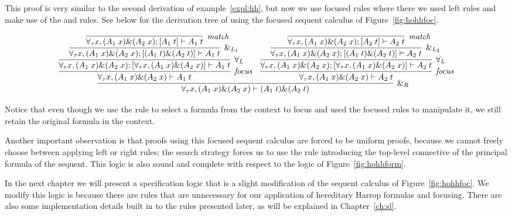 \begin{expl}
This proof is very similar to the second derivation of example~\ref{expl:hh}, but now we use focused rules where there we used left rules and make use of the  and  rules. See below for the derivation tree of  using the focused sequent calculus of Figure~\ref{fig:hohhfoc}.

{\scriptsize
$$
\infer[\rl{$\&_R$}]{\seq[\forall_\tau x , (A_1 \; x) \& (A_2 \; x)]{(A_1 \; t) \& (A_2 \; t)}}{
	\infer[\rl{focus}]{\seq[\forall_\tau x , (A_1 \; x) \& (A_2 \; x)]{A_1 \; t}}{
		\infer[\rl{$\forall_L$}]{\seq[\forall_\tau x , (A_1 \; x) \& (A_2 \; x) ; {[\forall_\tau x , (A_1 \; x) \& (A_2 \; x)]}]{A_1 \; t}}{
			\infer[\rl{$\&_{L_1}$}]{\seq[\forall_\tau x , (A_1 \; x) \& (A_2 \; x) ; {[(A_1 \; t) \& (A_2 \; t)]}]{A_1 \; t}}{
				\infer[\rl{match}]{\seq[\forall_\tau x , (A_1 \; x) \& (A_2 \; x) ; {[A_1 \; t]}]{A_1 \; t}}{}
			}
		}
	}
	&
	\infer[\rl{focus}]{\seq[\forall_\tau x , (A_1 \; x) \& (A_2 \; x)]{A_2 \; t}}{
		\infer[\rl{$\forall_L$}]{\seq[\forall_\tau x , (A_1 \; x) \& (A_2 \; x) ; {[\forall_\tau x , (A_1 \; x) \& (A_2 \; x)]}]{A_2 \; t}}{
			\infer[\rl{$\&_{L_2}$}]{\seq[\forall_\tau x , (A_1 \; x) \& (A_2 \; x) ; {[(A_1 \; t) \& (A_2 \; t)]}]{A_2 \; t}}{
				\infer[\rl{match}]{\seq[\forall_\tau x , (A_1 \; x) \& (A_2 \; x) ; {[A_2 \; t]}]{A_2 \; t}}{}
			}
		}
	}
}
$$
}

Notice that even though we use the  rule to select a formula from the context to focus and used the focused rules to manipulate it, we still retain the original formula in the context.
\end{expl}

Another important observation is that proofs using this focused sequent calculus are forced to be uniform proofs, because we cannot freely choose between applying left or right rules; the search strategy forces us to use the rule introducing the top-level connective of the principal formula of the sequent. This logic is also sound and complete with respect to the logic of Figure~\ref{fig:hohhform}. 

In the next chapter we will present a specification logic that is a slight modification of the sequent calculus of Figure~\ref{fig:hohhfoc}. We modify this logic is because there are rules that are unnecessary for our application of hereditary Harrop formulas and focusing. There are also some implementation details built in to the rules presented later, as will be explained in Chapter~\ref{ch:sl}.

